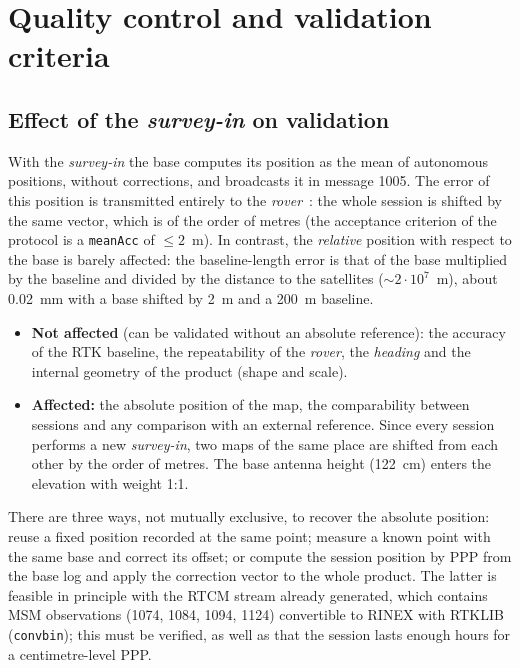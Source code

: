 
\section{Quality control and validation criteria}
\label{sec:validacio}

\subsection{Effect of the \emph{survey-in} on validation}
\label{subsec:efecte-surveyin}

With the \emph{survey-in} the base computes its position as the mean of autonomous positions, without corrections, and broadcasts it in message 1005. The error of this position is transmitted entirely to the \emph{rover}~\cite{ublox_f9p_im}: the whole session is shifted by the same vector, which is of the order of metres (the acceptance criterion of the protocol is a \texttt{meanAcc} of $\leq 2$~m). In contrast, the \emph{relative} position with respect to the base is barely affected: the baseline-length error is that of the base multiplied by the baseline and divided by the distance to the satellites ($\sim 2\cdot 10^{7}$~m), about 0.02~mm with a base shifted by 2~m and a 200~m baseline.

\begin{itemize}
    \item \textbf{Not affected} (can be validated without an absolute reference): the accuracy of the RTK baseline, the repeatability of the \emph{rover}, the \emph{heading} and the internal geometry of the product (shape and scale).
    \item \textbf{Affected:} the absolute position of the map, the comparability between sessions and any comparison with an external reference. Since every session performs a new \emph{survey-in}, two maps of the same place are shifted from each other by the order of metres. The base antenna height (122~cm) enters the elevation with weight 1:1.
\end{itemize}

There are three ways, not mutually exclusive, to recover the absolute position: reuse a fixed position recorded at the same point; measure a known point with the same base and correct its offset; or compute the session position by PPP from the base log and apply the correction vector to the whole product. The latter is feasible in principle with the RTCM stream already generated, which contains MSM observations (1074, 1084, 1094, 1124) convertible to RINEX with RTKLIB (\texttt{convbin}); this must be verified, as well as that the session lasts enough hours for a centimetre-level PPP.

